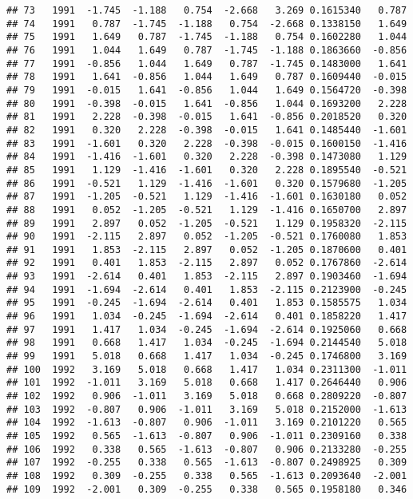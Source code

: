 \documentclass[]{article}
\begin{document}
\begin{verbatim}
## 73   1991  -1.745  -1.188   0.754  -2.668   3.269 0.1615340   0.787
## 74   1991   0.787  -1.745  -1.188   0.754  -2.668 0.1338150   1.649
## 75   1991   1.649   0.787  -1.745  -1.188   0.754 0.1602280   1.044
## 76   1991   1.044   1.649   0.787  -1.745  -1.188 0.1863660  -0.856
## 77   1991  -0.856   1.044   1.649   0.787  -1.745 0.1483000   1.641
## 78   1991   1.641  -0.856   1.044   1.649   0.787 0.1609440  -0.015
## 79   1991  -0.015   1.641  -0.856   1.044   1.649 0.1564720  -0.398
## 80   1991  -0.398  -0.015   1.641  -0.856   1.044 0.1693200   2.228
## 81   1991   2.228  -0.398  -0.015   1.641  -0.856 0.2018520   0.320
## 82   1991   0.320   2.228  -0.398  -0.015   1.641 0.1485440  -1.601
## 83   1991  -1.601   0.320   2.228  -0.398  -0.015 0.1600150  -1.416
## 84   1991  -1.416  -1.601   0.320   2.228  -0.398 0.1473080   1.129
## 85   1991   1.129  -1.416  -1.601   0.320   2.228 0.1895540  -0.521
## 86   1991  -0.521   1.129  -1.416  -1.601   0.320 0.1579680  -1.205
## 87   1991  -1.205  -0.521   1.129  -1.416  -1.601 0.1630180   0.052
## 88   1991   0.052  -1.205  -0.521   1.129  -1.416 0.1650700   2.897
## 89   1991   2.897   0.052  -1.205  -0.521   1.129 0.1958320  -2.115
## 90   1991  -2.115   2.897   0.052  -1.205  -0.521 0.1760080   1.853
## 91   1991   1.853  -2.115   2.897   0.052  -1.205 0.1870600   0.401
## 92   1991   0.401   1.853  -2.115   2.897   0.052 0.1767860  -2.614
## 93   1991  -2.614   0.401   1.853  -2.115   2.897 0.1903460  -1.694
## 94   1991  -1.694  -2.614   0.401   1.853  -2.115 0.2123900  -0.245
## 95   1991  -0.245  -1.694  -2.614   0.401   1.853 0.1585575   1.034
## 96   1991   1.034  -0.245  -1.694  -2.614   0.401 0.1858220   1.417
## 97   1991   1.417   1.034  -0.245  -1.694  -2.614 0.1925060   0.668
## 98   1991   0.668   1.417   1.034  -0.245  -1.694 0.2144540   5.018
## 99   1991   5.018   0.668   1.417   1.034  -0.245 0.1746800   3.169
## 100  1992   3.169   5.018   0.668   1.417   1.034 0.2311300  -1.011
## 101  1992  -1.011   3.169   5.018   0.668   1.417 0.2646440   0.906
## 102  1992   0.906  -1.011   3.169   5.018   0.668 0.2809220  -0.807
## 103  1992  -0.807   0.906  -1.011   3.169   5.018 0.2152000  -1.613
## 104  1992  -1.613  -0.807   0.906  -1.011   3.169 0.2101220   0.565
## 105  1992   0.565  -1.613  -0.807   0.906  -1.011 0.2309160   0.338
## 106  1992   0.338   0.565  -1.613  -0.807   0.906 0.2133280  -0.255
## 107  1992  -0.255   0.338   0.565  -1.613  -0.807 0.2498925   0.309
## 108  1992   0.309  -0.255   0.338   0.565  -1.613 0.2093640  -2.001
## 109  1992  -2.001   0.309  -0.255   0.338   0.565 0.1958180   0.346

\end{verbatim}
\end{document}
